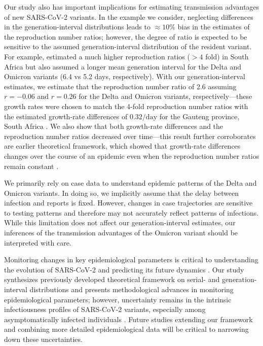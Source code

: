 \documentclass[12pt]{article}
\begin{document}
Our study also has important implications for estimating transmission advantages of new SARS-CoV-2 variants.
In the example we consider, neglecting differences in the generation-interval distributions leads to $\approx 10\%$ bias in the estimates of the reproduction number ratios; however, the degree of ratio is expected to be sensitive to the assumed generation-interval distribution of the resident variant.
For example, \cite{pearson2021bounding} estimated a much higher reproduction ratios ($> 4$ fold) in South Africa but also assumed a longer mean generation interval for the Delta and Omicron variants (6.4 vs 5.2 days, respectively).
With our generation-interval estimates, we estimate that the reproduction number ratio of 2.6 assuming $r=-0.06$ and $r=0.26$ for the Delta and Omicron variants, respectively---these growth rates were chosen to match the 4-fold reproduction number ratios with the estimated growth-rate differences of $0.32/\mathrm{day}$ for the Gauteng province, South Africa \cite{pearson2021bounding}.
We also show that both growth-rate differences and the reproduction number ratios decreased over time---this result further corroborates are earlier theoretical framework, which showed that growth-rate differences changes over the course of an epidemic even when the reproduction number ratios remain constant \citep{park2021roles}.

We primarily rely on case data to understand epidemic patterns of the Delta and Omicron variants.
In doing so, we implicitly assume that the delay between infection and reports is fixed.
However, changes in case trajectories are sensitive to testing patterns and therefore may not accurately reflect patterns of infections.
While this limitation does not affect our generation-interval estimates, our inferences of the transmission advantages of the Omicron variant should be interpreted with care.

Monitoring changes in key epidemiological parameters is critical to understanding the evolution of SARS-CoV-2 and predicting its future dynamics \citep{kraemer2021monitoring}.
Our study synthesizes previously developed theoretical framework on serial- and generation-interval distributions and presents methodological advances in monitoring epidemiological parameters;
however, uncertainty remains in the intrinsic infectiousness profiles of SARS-CoV-2 variants, especially among asymptomatically infected individuals \citep{park2020time}.
Future studies extending our framework and combining more detailed epidemiological data will be critical to narrowing down these uncertainties.
\end{document}
